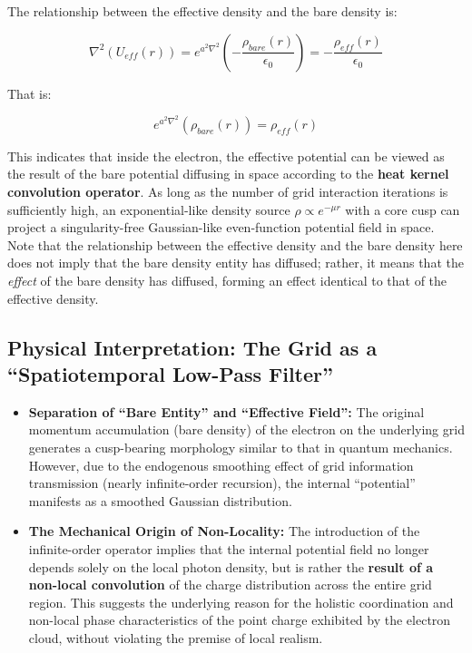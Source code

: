 \documentclass[12pt, a4paper]{article}
\begin{document}
The relationship between the effective density and the bare density is:

\begin{equation}
\nabla^{2} \left( U_{eff}(r) \right)  =  e^{a^2\nabla^2} \left(  -\frac{\rho_{bare}(r)}{\epsilon_0} \right) = -\frac{\rho_{eff}(r)}{\epsilon_0}
\end{equation}

That is:

\begin{equation}
e^{a^2\nabla^2} \left(  \rho_{bare}(r) \right) = \rho_{eff}(r)
\end{equation}

This indicates that inside the electron, the effective potential can be viewed as the result of the bare potential diffusing in space according to the \textbf{heat kernel convolution operator}. As long as the number of grid interaction iterations is sufficiently high, an exponential-like density source $\rho \propto e^{-\mu r}$ with a core cusp can project a singularity-free Gaussian-like even-function potential field in space. Note that the relationship between the effective density and the bare density here does not imply that the bare density entity has diffused; rather, it means that the \textit{effect} of the bare density has diffused, forming an effect identical to that of the effective density.

\subsection{Physical Interpretation: The Grid as a ``Spatiotemporal Low-Pass Filter''}

\begin{itemize}
    \item \textbf{Separation of ``Bare Entity'' and ``Effective Field'':} The original momentum accumulation (bare density) of the electron on the underlying grid generates a cusp-bearing morphology similar to that in quantum mechanics. However, due to the endogenous smoothing effect of grid information transmission (nearly infinite-order recursion), the internal ``potential'' manifests as a smoothed Gaussian distribution.
    \item \textbf{The Mechanical Origin of Non-Locality:} The introduction of the infinite-order operator implies that the internal potential field no longer depends solely on the local photon density, but is rather the \textbf{result of a non-local convolution} of the charge distribution across the entire grid region. This suggests the underlying reason for the holistic coordination and non-local phase characteristics of the point charge exhibited by the electron cloud, without violating the premise of local realism.
\end{itemize}
\end{document}
